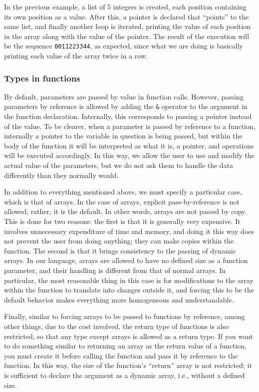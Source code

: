 \documentclass[10pt,a4paper]{article}
\begin{document}
In the previous example, a list of 5 integers is created, each position containing its own position as a value. After this, a pointer is declared that “points” to the same list, and finally another loop is iterated, printing the value of each position in the array along with the value of the pointer. The result of the execution will be the sequence \texttt{\color{blue}0011223344}, as expected, since what we are doing is basically printing each value of the array twice in a row.

\subsubsection{Types in functions}
By default, parameters are passed by value in function calls. However, passing parameters by reference is allowed by adding the \texttt{\color{blue}\&} operator to the argument in the function declaration. Internally, this corresponds to passing a pointer instead of the value. To be clearer, when a parameter is passed by reference to a function, internally a pointer to the variable in question is being passed, but within the body of the function it will be interpreted as what it is, a pointer, and operations will be executed accordingly. In this way, we allow the user to use and modify the actual value of the parameters, but we do not ask them to handle the data differently than they normally would.

In addition to everything mentioned above, we must specify a particular case, which is that of arrays. In the case of arrays, explicit pass-by-reference is not allowed; rather, it is the default. In other words, arrays are not passed by copy. This is done for two reasons: the first is that it is generally very expensive. It involves unnecessary expenditure of time and memory, and doing it this way does not prevent the user from doing anything; they can make copies within the function. The second is that it brings consistency to the passing of dynamic arrays. In our language, arrays are allowed to have no defined size as a function parameter, and their handling is different from that of normal arrays. In particular, the most reasonable thing in this case is for modifications to the array within the function to translate into changes outside it, and forcing this to be the default behavior makes everything more homogeneous and understandable.

Finally, similar to forcing arrays to be passed to functions by reference, among other things, due to the cost involved, the return type of functions is also restricted, so that any type except arrays is allowed as a return type. If you want to do something similar to returning an array as the return value of a function, you must create it before calling the function and pass it by reference to the function. In this way, the size of the function's “return” array is not restricted; it is sufficient to declare the argument as a dynamic array, i.e., without a defined size.
\end{document}
